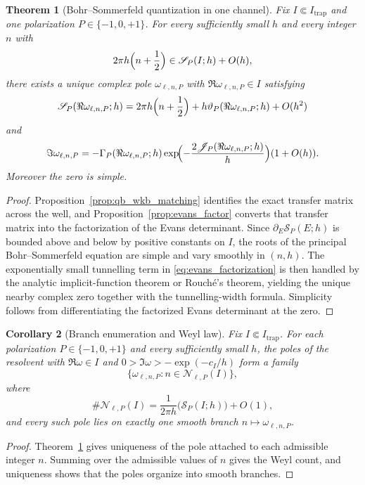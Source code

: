 \documentclass[12pt]{article}
\numberwithin{equation}{section}
\theoremstyle{plain}
\newtheorem{theorem}{Theorem}[section]
\newtheorem{corollary}[theorem]{Corollary}
\theoremstyle{definition}
\theoremstyle{remark}
\begin{document}
\begin{theorem}[Bohr--Sommerfeld quantization in one channel]\label{thm:qb_bs}
Fix $I\Subset I_{\mathrm{trap}}$ and one polarization $P\in\{-1,0,+1\}$.  For every sufficiently small $h$ and every integer $n$ with
\[
   2\pi h\Bigl(n+\frac12\Bigr)\in \mathscr S_P(I;h)+O(h),
\]
there exists a unique complex pole $\omega_{\ell,n,P}$ with $\Re\omega_{\ell,n,P}\in I$ satisfying
\[
   \mathscr S_P(\Re\omega_{\ell,n,P};h)
   =
   2\pi h\Bigl(n+\frac12\Bigr)
   +h\vartheta_P(\Re\omega_{\ell,n,P};h)
   +O(h^2)
\]
and
\[
   \Im\omega_{\ell,n,P}
   =
   -\Gamma_P(\Re\omega_{\ell,n,P};h)
   \exp\!\Bigl(-\frac{2\mathscr J_P(\Re\omega_{\ell,n,P};h)}{h}\Bigr)
   (1+O(h)).
\]
Moreover the zero is simple.
\end{theorem}

\begin{proof}
Proposition~\ref{prop:qb_wkb_matching} identifies the exact transfer matrix across the well, and Proposition~\ref{prop:evans_factor} converts that transfer matrix into the factorization of the Evans determinant.  Since $\partial_E\mathscr S_P(E;h)$ is bounded above and below by positive constants on $I$, the roots of the principal Bohr--Sommerfeld equation are simple and vary smoothly in $(n,h)$.  The exponentially small tunnelling term in \eqref{eq:evans_factorization} is then handled by the analytic implicit-function theorem or Rouch\'e's theorem, yielding the unique nearby complex zero together with the tunnelling-width formula.  Simplicity follows from differentiating the factorized Evans determinant at the zero.
\end{proof}

\begin{corollary}[Branch enumeration and Weyl law]\label{cor:qb_enumeration}
Fix $I\Subset I_{\mathrm{trap}}$.  For each polarization $P\in\{-1,0,+1\}$ and every sufficiently small $h$, the poles of the resolvent with $\Re\omega\in I$ and $0>\Im\omega>-\exp(-c_I/h)$ form a family
\[
   \{\omega_{\ell,n,P}:n\in\mathcal N_{\ell,P}(I)\},
\]
where
\[
   \#\mathcal N_{\ell,P}(I)
   =
   \frac{1}{2\pi h}\bigl(\mathscr S_P(I;h)\bigr)+O(1),
\]
and every such pole lies on exactly one smooth branch $n\mapsto \omega_{\ell,n,P}$.
\end{corollary}

\begin{proof}
Theorem~\ref{thm:qb_bs} gives uniqueness of the pole attached to each admissible integer $n$.  Summing over the admissible values of $n$ gives the Weyl count, and uniqueness shows that the poles organize into smooth branches.
\end{proof}
\end{document}
